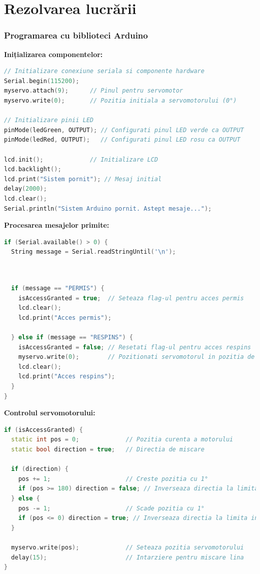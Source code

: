 \documentclass{report}
\begin{document}
\chapter{Rezolvarea lucrării}
\subsection{Programarea cu biblioteci Arduino}
\textbf{Inițializarea componentelor:}
\begin{lstlisting}[language=C++]
// Initializare conexiune seriala si componente hardware
Serial.begin(115200);
myservo.attach(9);      // Pinul pentru servomotor
myservo.write(0);       // Pozitia initiala a servomotorului (0°)

// Initializare pinii LED
pinMode(ledGreen, OUTPUT); // Configurati pinul LED verde ca OUTPUT
pinMode(ledRed, OUTPUT);   // Configurati pinul LED rosu ca OUTPUT

lcd.init();             // Initializare LCD
lcd.backlight();
lcd.print("Sistem pornit"); // Mesaj initial
delay(2000); 
lcd.clear();
Serial.println("Sistem Arduino pornit. Astept mesaje...");
\end{lstlisting}

\textbf{Procesarea mesajelor primite:}
\begin{lstlisting}[language=C++]
if (Serial.available() > 0) {
  String message = Serial.readStringUntil('\n');
      \end{lstlisting}
    \newpage
    \vspace*{1cm}
    \begin{lstlisting}[language=C++]
    

  if (message == "PERMIS") {
    isAccessGranted = true;  // Seteaza flag-ul pentru acces permis
    lcd.clear();
    lcd.print("Acces permis");

  } else if (message == "RESPINS") {
    isAccessGranted = false; // Resetati flag-ul pentru acces respins
    myservo.write(0);        // Pozitionati servomotorul in pozitia de start (0°)
    lcd.clear();
    lcd.print("Acces respins");
  }
}
\end{lstlisting}

\textbf{Controlul servomotorului:}
\begin{lstlisting}[language=C++]
if (isAccessGranted) {
  static int pos = 0;             // Pozitia curenta a motorului
  static bool direction = true;   // Directia de miscare

  if (direction) {
    pos += 1;                     // Creste pozitia cu 1°
    if (pos >= 180) direction = false; // Inverseaza directia la limita superioara
  } else {
    pos -= 1;                     // Scade pozitia cu 1°
    if (pos <= 0) direction = true; // Inverseaza directia la limita inferioara
  }

  myservo.write(pos);             // Seteaza pozitia servomotorului
  delay(15);                      // Intarziere pentru miscare lina
}
\end{lstlisting}
\end{document}
